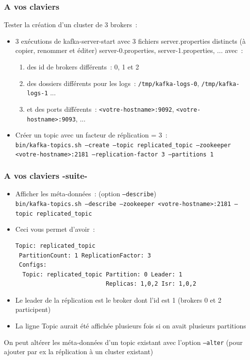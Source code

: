 \documentclass{beamer}
\begin{document}
\begin{frame}
	\frametitle{A vos claviers}
	Tester la création d'un cluster de 3 brokers~: 
	\begin{itemize}
		\item 3 exécutions de kafka-server-start avec 3 fichiers server.properties distincts (à copier, renommer et éditer) server-0.properties, server-1.properties, ... avec~: 
		\begin{enumerate}
		 \item des id de brokers différents~: 0, 1 et 2
		 \item des dossiers différents pour les logs~: \texttt{/tmp/kafka-logs-0}, \texttt{/tmp/kafka-logs-1} ...
		 \item et des ports différents~: \texttt{<votre-hostname>:9092}, \texttt{<votre-hostname>:9093}, ...
		\end{enumerate}
		\item Créer un topic avec un facteur de réplication = 3~:\\
		\footnotesize
		\texttt{bin/kafka-topics.sh ---create ---topic replicated\_topic ---zookeeper <votre-hostname>:2181 ---replication-factor 3 ---partitions 1}
		\normalsize
	\end{itemize}
\end{frame} 	

\begin{frame}[fragile]
\frametitle{A vos claviers -suite-}
\begin{itemize}		
		\item Afficher les méta-données~: (option \texttt{---describe})\\
		\footnotesize
		\texttt{bin/kafka-topics.sh ---describe ---zookeeper <votre-hostname>:2181 ---topic replicated\_topic}
		\normalsize
		\item Ceci vous permet d'avoir~:
		
\begin{lstlisting}
Topic: replicated_topic 
 PartitionCount: 1 ReplicationFactor: 3 
 Configs:
  Topic: replicated_topic Partition: 0 Leader: 1 
                          Replicas: 1,0,2 Isr: 1,0,2    
\end{lstlisting}
\item Le leader de la réplication est le broker dont l'id est 1 (brokers 0 et 2 participent)
\item La ligne Topic aurait été affichée plusieurs fois si on avait plusieurs partitions
	\end{itemize}
On peut altérer les méta-données d'un topic existant avec l'option \texttt{---alter} (pour ajouter par ex la réplication à un cluster existant)
\end{frame} 
\end{document}
